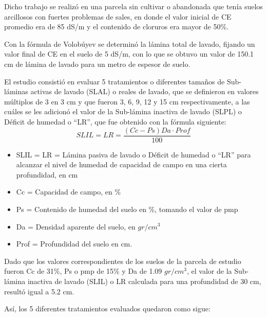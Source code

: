 Dicho trabajo se realizó en una parcela sin cultivar o abandonada que tenía suelos arcillosos con fuertes problemas de sales, en donde el valor inicial de CE promedio era de 85 dS/m y el contenido de cloruros era mayor de 50\%.

Con la fórmula de Volobúyev se determinó la lámina total de lavado, fijando un valor final de CE en el suelo de 5 dS/m, con lo que se obtuvo un valor de 150.1 cm de lámina de lavado para un metro de espesor de suelo.

El estudio consistió en evaluar 5 tratamientos o diferentes tamaños de Sub-láminas activas de lavado (SLAL) o reales de lavado, que se definieron en valores múltiplos de 3 en 3 cm y que fueron 3, 6, 9, 12 y 15 cm respectivamente, a las cuáles se les adicionó el valor de la Sub-lámina inactiva de lavado (SLPL) o Déficit de humedad o “LR”, que fue obtenido con la fórmula siguiente:
\begin{equation}
    SLIL = LR = \frac{(Cc - Ps) Da \cdot Prof}{100}
\end{equation}
\begin{notation}
    \begin{itemize} En donde:
        \item SLIL = LR = Lámina pasiva de lavado o Déficit de humedad o “LR” para alcanzar el nivel de humedad de capacidad de campo en una cierta profundidad, en cm
        \item Cc = Capacidad de campo, en \%
        \item Ps = Contenido de humedad del suelo en \%, tomando el valor de pmp
        \item Da = Densidad aparente del suelo, en $gr/cm^3$
        \item Prof = Profundidad del suelo en cm.
    \end{itemize}
\end{notation}
Dado que los valores correspondientes de los suelos de la parcela de estudio fueron Cc de 31\%, Ps o pmp de 15\% y Da de 1.09 $gr/cm^3$, el valor de la Sub-lámina inactiva de lavado (SLIL) o LR calculada para una profundidad de 30 cm, resultó igual a 5.2 cm.

Así, los 5 diferentes tratamientos evaluados quedaron como sigue:

